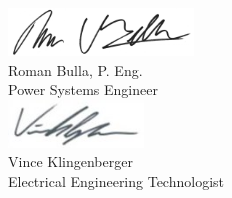 \begin{multicols}{2}
\centering
\includegraphics[height=0.5in, keepaspectratio=true]{../Images/Roman_signature.jpg} \\
Roman Bulla, P. Eng. \\Power Systems Engineer \\
\includegraphics[height=0.5in, keepaspectratio=true]{../Images/Vince_signature.jpg} \\
Vince Klingenberger \\Electrical Engineering Technologist \\
\end{multicols}
